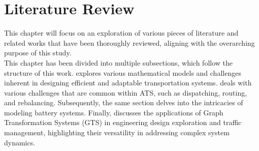 \chapter{Literature Review}\label{ch:related_work}
This chapter will focus on an exploration of various pieces of literature and related works that have been thoroughly reviewed, aligning with the overarching purpose of this study.\\
This chapter has been divided into multiple subsections, which follow the structure of this work.  explores various mathematical models and challenges inherent in designing efficient and adaptable transportation systems.  deals with various challenges that are common within ATS, such as dispatching, routing, and rebalancing. Subsequently, the same section delves into the intricacies of modeling battery systems. Finally,  discusses the applications of Graph Transformation Systems (GTS) in engineering design exploration and traffic management, highlighting their versatility in addressing complex system dynamics.


